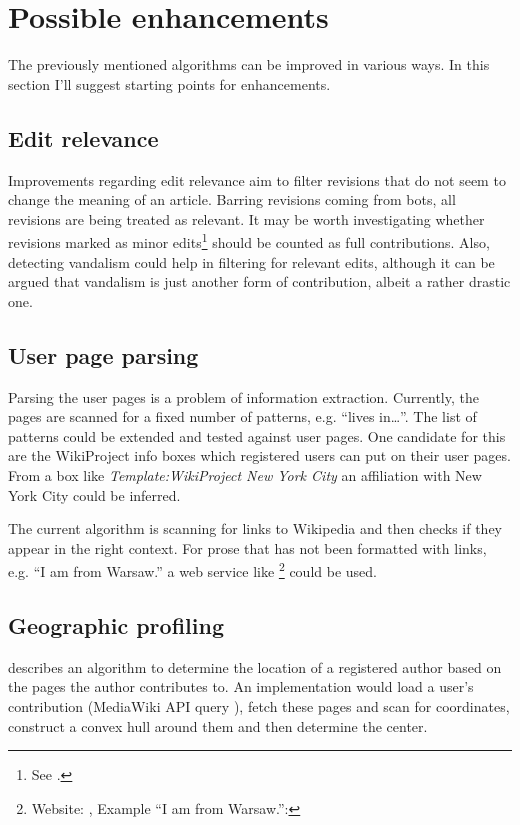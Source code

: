 \section{Possible enhancements}

The previously mentioned algorithms can be improved in various ways.
In this section I'll suggest starting points for enhancements.

\subsection{Edit relevance}

Improvements regarding edit relevance aim to filter revisions that do not seem to change the meaning of an article.
Barring revisions coming from bots, all revisions are being treated as relevant.
It may be worth investigating whether revisions marked as minor edits\footnote{See .} should be counted as full contributions.
Also, detecting vandalism could help in filtering for relevant edits, although it can be argued that vandalism is just another form of contribution, albeit a rather drastic one.

\subsection{User page parsing}

Parsing the user pages is a problem of information extraction.
Currently, the pages are scanned for a fixed number of patterns, e.g. ``lives in\ldots''.
The list of patterns could be extended and tested against user pages.
One candidate for this are the WikiProject info boxes which registered users can put on their user pages.
From a box like \emph{Template:WikiProject New York City} an affiliation with New York City could be inferred.

The current algorithm is scanning for links to Wikipedia and then checks if they appear in the right context.
For prose that has not been formatted with links, e.g. ``I am from Warsaw.'' a web service like \footnote{Website: , Example ``I am from Warsaw.'': } could be used.

\subsection{Geographic profiling}

\textcite{lieberman2009you} describes an algorithm to determine the location of a registered author based on the pages the author contributes to.
An implementation would load a user's contribution (MediaWiki \ac{API} query ), fetch these pages and scan for coordinates, construct a convex hull around them and then determine the center.
